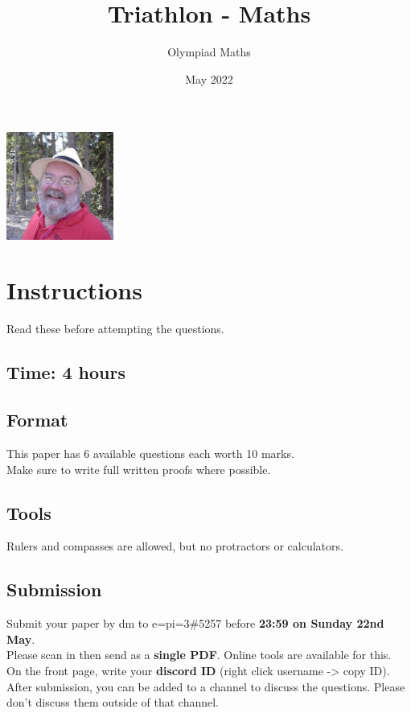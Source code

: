 \documentclass{exam}
\title{Triathlon - Maths}
\author{Olympiad Maths}
\date{May 2022}
\begin{document}
\large
\maketitle

\begin{center}
    \vspace{-10pt}
    \includegraphics[height=100pt]{geoffsmith}
    \vspace{-10pt}
\end{center}

\section* {Instructions}

Read these before attempting the questions.

\subsection*{Time: 4 hours}

\subsection*{Format}
This paper has 6 available questions each worth 10 marks.\\
Make sure to write full written proofs where possible.

\subsection*{Tools}
Rulers and compasses are allowed, but no protractors or calculators.

\subsection*{Submission}
Submit your paper by dm to
{\selectfont e=pi=3\#5257}
before \textbf{23:59 on Sunday 22nd May}.\\
Please scan in then send as a \textbf{single PDF}. Online tools are available for this.\\
On the front page, write your \textbf{discord ID} (right click username -> copy ID).\\
After submission, you can be added to a channel to discuss the questions. Please don't discuss them outside of that channel.
\end{document}
